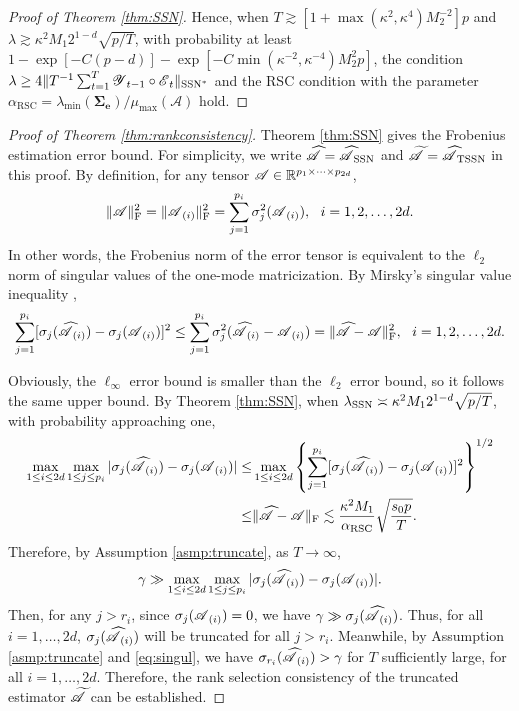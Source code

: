 \documentclass[12pt]{article}
\newcommand{\bm}{\boldsymbol}
\newcommand{\cm}[1]{\mbox{\boldmath$\mathscr{#1}$}}
\begin{document}
\begin{proof}[Proof of Theorem \ref{thm:SSN}]
	Hence, when $T\gtrsim [1+\max(\kappa^2,\kappa^4)M_2^{-2}]p$ and $\lambda\gtrsim\kappa^2M_1 2^{1-d}\sqrt{p/T}$, with probability at least $1-\exp[-C(p-d)]-\exp[-C\min(\kappa^{-2},\kappa^{-4})M_2^2p]$, the condition $\lambda\geq4\|T^{-1}\sum_{t=1}^T\cm{Y}_{t-1}\circ\cm{E}_t\|_{\text{SSN}^*}$ and the RSC condition with the parameter $\alpha_{\text{RSC}}=\lambda_{\min}(\bm{\Sigma_e})/\mu_{\max}(\mathcal{A})$ hold.
\end{proof}

\begin{proof}[Proof of Theorem \ref{thm:rankconsistency}]
	Theorem \ref{thm:SSN} gives the Frobenius estimation error bound. For simplicity, we write $\cm{\widehat{A}}=\cm{\widehat{A}}_{\text{SSN}}$ and $\cm{\widetilde{A}}=\cm{\widehat{A}}_{\text{TSSN}}$ in this proof.
	By definition, for any tensor $\cm{A}\in\mathbb{R}^{p_1\times\cdots\times p_{2d}}$,
	\begin{equation}
	\|\cm{A}\|_{\text{F}}^2=\|\cm{A}_{(i)}\|_{\text{F}}^2=\sum_{j=1}^{p_i}\sigma_j^2(\cm{A}_{(i)}),~~i=1,2,\dots,2d.
	\end{equation}
	In other words, the Frobenius norm of the error tensor is equivalent to the $\ell_2$ norm of singular values of the one-mode matricization. By Mirsky's singular value inequality \citep{mirsky1960symmetric},
	\begin{equation}\label{eq:mirsky}
	\sum_{j=1}^{p_i}[\sigma_j(\cm{\widehat{A}}_{(i)})-\sigma_j(\cm{A}_{(i)})]^2\leq\sum_{j=1}^{p_i}\sigma_j^2(\cm{\widehat{A}}_{(i)}-\cm{A}_{(i)})=\|\cm{\widehat{A}}-\cm{A}\|_{\text{F}}^2,~~i=1,2,\dots,2d.
	\end{equation}
	
	Obviously, the $\ell_\infty$ error bound is smaller than the $\ell_2$ error bound, so it follows the same upper bound. By Theorem \ref{thm:SSN}, when $\lambda_{\textup{SSN}}\asymp\kappa^2M_12^{1-d}\sqrt{p/T}$, with probability approaching one,
	\begin{align}
	\max_{1\leq i\leq 2d}\max_{1\leq j\leq p_i}|\sigma_j(\cm{\widehat{A}}_{(i)})-\sigma_j(\cm{A}_{(i)})|\leq& \max_{1\leq i\leq 2d}\left\{\sum_{j=1}^{p_i}[\sigma_j(\cm{\widehat{A}}_{(i)})-\sigma_j(\cm{A}_{(i)})]^2\right\}^{1/2} \notag\\
	\leq&\|\cm{\widehat{A}}-\cm{A}\|_{\text{F}}\lesssim \frac{\kappa^2M_1}{\alpha_{\text{RSC}}}\sqrt{\frac{s_0p}{T}}.\label{eq:singul}
	\end{align}
	Therefore, by Assumption \ref{asmp:truncate},	as $T\rightarrow\infty$,
	\begin{equation}
	\gamma \gg \max_{1\leq i\leq 2d}\max_{1\leq j\leq p_i}|\sigma_j(\cm{\widehat{A}}_{(i)})-\sigma_j(\cm{A}_{(i)})|.
	\end{equation}
	Then, for any $j>r_i$, since $\sigma_j(\cm{A}_{(i)})=0$, we have $\gamma \gg \sigma_j(\cm{\widehat{A}}_{(i)})$. Thus,  for all $i=1,\dots, 2d$, $\sigma_j(\cm{\widehat{A}}_{(i)})$ will be truncated for all $j>r_i$.
	Meanwhile, by Assumption \ref{asmp:truncate} and \eqref{eq:singul}, we have $\sigma_{r_i}(\cm{\widehat{A}}_{(i)})>\gamma$ for $T$ sufficiently large, for all $i=1,\dots, 2d$. Therefore, the rank selection consistency of the truncated estimator $\cm{\widetilde{A}}$ can be established.
	

\end{proof}
\end{document}
